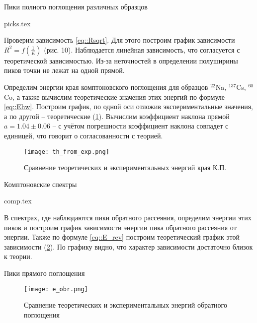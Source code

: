 \begin{table}[h]
\begin{center}
  \caption{Пики полного поглощения различных образцов}
  \label{tab:my_label}
  {picks.tex}
\end{center}
\end{table}

Проверим зависимость \eqref{eq::Rsqrt}. Для этого построим график зависимости $R^2 = f(\frac{1}{E})$
(рис. 10). Наблюдается линейная зависимость, что согласуется с теоретической зависимостью. Из-за неточностей в определении
полуширины пиков точки не лежат на одной прямой.

Определим энергии края комптоновского поглощения для образцов $^{22}$Na,
$^{137}$Cs, $^{60}$Co, а также вычислим теоретические значения этих энергий по
формуле \eqref{eq::Ehw}. Построим график, по одной оси отложив экспериментальные
значения, а по другой -- теоретические (\ref{img::th_exp}). Вычислим коэффициент
наклона прямой $a = 1.04 \pm 0.06$ --  с учётом погрешности коэффициент наклона
совпадет с единицей, что говорит о согласованности с теорией.

\begin{figure}[h!]
  \centering
  \texttt{[image: th\_from\_exp.png]}
  \caption{Сравнение теоретических и экспериментальных энергий края К.П.}
  \label{img::th_exp}
\end{figure}

\begin{table}[h!]
  \begin{center}
    \caption{Комптоновские спектры}
    {comp.tex}
  \end{center}
\end{table}

В спектрах, где наблюдаются пики обратного рассеяния, определим энергии этих
пиков и построим график зависимости энергии пика обратного рассеяния от энергии.
Также по формуле \eqref{eq::E_rev} построим теоретический график этой
зависимости (\ref{img::e_obr}).
По графику видно, что характер зависимости достаточно близок к теории.
\begin{table}[h!]
  \centering
  \caption{Пики прямого поглощения}
  
\end{table}


\begin{figure}[h!]
  \centering
  \texttt{[image: e\_obr.png]}
  \caption{Сравнение теоретических и экспериментальных энергий обратного поглощения}
  \label{img::e_obr}
\end{figure}

